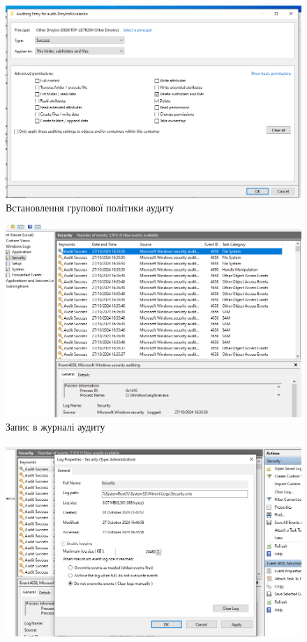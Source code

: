 \documentclass[oneside,14pt]{extarticle}
\begin{document}
\begin{normalsize}
	\begin{figure}[H]
		\centering
		\includegraphics[width=\columnwidth]{2}
		\caption{Встановлення групової політики аудиту}
	\end{figure}
	\begin{figure}[H]
		\centering
		\includegraphics[width=\columnwidth]{3}
		\caption{Запис в журналі аудиту}
	\end{figure}
		\begin{figure}[H]
		\centering
		\includegraphics[width=\columnwidth]{4}

\end{figure}
\end{normalsize}
\end{document}
